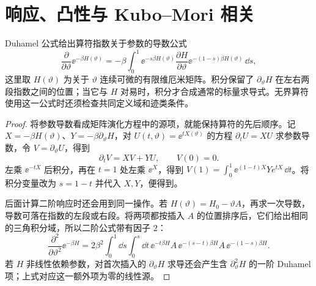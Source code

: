 \section{响应、凸性与 Kubo--Mori 相关}

\begin{lemma}
Duhamel 公式给出算符指数关于参数的导数公式
\begin{equation}
 \frac{\partial}{\partial\vartheta}\ee^{-\beta H(\vartheta)}
 =-\beta\int_0^1\ee^{-s\beta H(\vartheta)}
 \frac{\partial H}{\partial\vartheta}
 \ee^{-(1-s)\beta H(\vartheta)}\,\dd s,
 \label{eq:phys-sm-duhamel-formula}
\end{equation}
这里取 \(H(\vartheta)\) 为关于 \(\vartheta\) 连续可微的有限维厄米矩阵。积分保留了 \(\partial_\vartheta H\) 在左右两段指数之间的位置；当它与 \(H\) 对易时，积分才合成通常的标量求导式。无界算符使用这一公式时还须检查共同定义域和迹类条件。

\end{lemma}
\begin{proof}
将参数导数看成矩阵演化方程中的源项，就能保持算符的先后顺序。记 $X=-\beta H(\vartheta)$、$Y=-\beta\partial_\vartheta H$，对 $U(t,\vartheta)=\ee^{tX(\vartheta)}$ 的方程 $\partial_tU=XU$ 求参数导数，令 $V=\partial_\vartheta U$，得到
\[
 \partial_tV=XV+YU,\qquad V(0)=0.
\]
左乘 $\ee^{-tX}$ 后积分，再在 $t=1$ 处左乘 $\ee^X$，得到 $V(1)=\int_0^1\ee^{(1-t)X}Ye^{tX}\,\dd t$。将积分变量改为 $s=1-t$ 并代入 $X,Y$，便得到。

后面计算二阶响应时还会用到同一操作。若 \(H(\vartheta)=H_0-\vartheta A\)，再求一次导数，导数可落在指数的左段或右段。将两项都按插入 $A$ 的位置排序后，它们给出相同的三角积分域，所以二阶公式带有因子 \(2\)：
\begin{equation}
 \frac{\partial^2}{\partial\vartheta^2}\ee^{-\beta H}
 =2\beta^2\int_0^1\dd s\int_0^s\dd t\,
 \ee^{-t\beta H}A\,\ee^{-(s-t)\beta H}A\,\ee^{-(1-s)\beta H}
 .
 \label{eq:phys-sm-duhamel-second-order}
\end{equation}
若 \(H\) 非线性依赖参数，对首次插入的 \(\partial_\vartheta H\) 求导还会产生含 \(\partial_\vartheta^2H\) 的一阶 Duhamel 项；上式对应这一额外项为零的线性源。
\end{proof}

